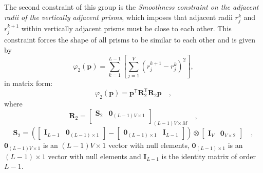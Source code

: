 The second constraint of this group is the \textit{Smoothness constraint on the adjacent radii of the 
vertically adjacent prisms}, which imposes that adjacent radii $r_{j}^{k}$ and $r_{j}^{k+1}$ within vertically 
adjacent prisms must be close to each other. This constraint forces the shape of all prisms to be similar to each other
and is given by
\begin{equation}\label{eq:phi2_sum}
\varphi_{2}(\mathbf{p}) = \sum\limits^{L-1}_{k=1}\left[\sum\limits^{V}_{j=1}\left(r^{k+1}_{j}-r^{k}_{j}\right)^2\right],
\end{equation}
in matrix form:
\begin{equation}
\varphi_{2}(\mathbf{p}) = \mathbf{p}^{\mathsf{T}} \mathbf{R}^{\mathsf{T}}_{2}\mathbf{R}_{2}\mathbf{p} \quad ,
\label{eq:phi2}
\end{equation}
where 
\begin{equation}
\mathbf{R}_{2} = 
\begin{bmatrix}
\mathbf{S}_{2} & \mathbf{0}_{(L-1)V \times 1} \\
\end{bmatrix}_{(L-1)V \times M} \quad ,
\label{eq:R2-matrix}
\end{equation}
\begin{equation}
\mathbf{S}_{2} =
\left( 
\begin{bmatrix} \mathbf{I}_{L-1} & \mathbf{0}_{(L-1) \times 1} \end{bmatrix} -
\begin{bmatrix} \mathbf{0}_{(L-1) \times 1} & \mathbf{I}_{L-1} \end{bmatrix} 
\right) \otimes 
\begin{bmatrix} \mathbf{I}_{V} & \mathbf{0}_{V \times 2} \end{bmatrix} \quad ,
\label{eq:S2-matrix}
\end{equation}
$\mathbf{0}_{(L-1)V \times 1}$ is an $(L-1)V \times 1$ vector with null elements,
$\mathbf{0}_{(L-1) \times 1}$ is an $(L-1) \times 1$ vector with null elements and 
$\mathbf{I}_{L-1}$ is the identity matrix of order $L-1$.

